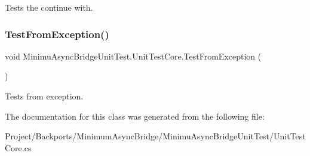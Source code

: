 Tests the continue with. 

\mbox{\label{class_minimu_async_bridge_unit_test_1_1_unit_test_core_a239f3574cb7588879aca72d8544f8019}} 
\subsubsection{\texorpdfstring{Test\+From\+Exception()}{TestFromException()}}
{\footnotesize\ttfamily void Minimu\+Async\+Bridge\+Unit\+Test.\+Unit\+Test\+Core.\+Test\+From\+Exception (\begin{DoxyParamCaption}{ }\end{DoxyParamCaption})\hspace{0.3cm}{\ttfamily [inline]}}



Tests from exception. 



The documentation for this class was generated from the following file\+:\begin{DoxyCompactItemize}
\item 
Project/\+Backports/\+Minimum\+Async\+Bridge/\+Minimu\+Async\+Bridge\+Unit\+Test/Unit\+Test\+Core.\+cs\end{DoxyCompactItemize}

